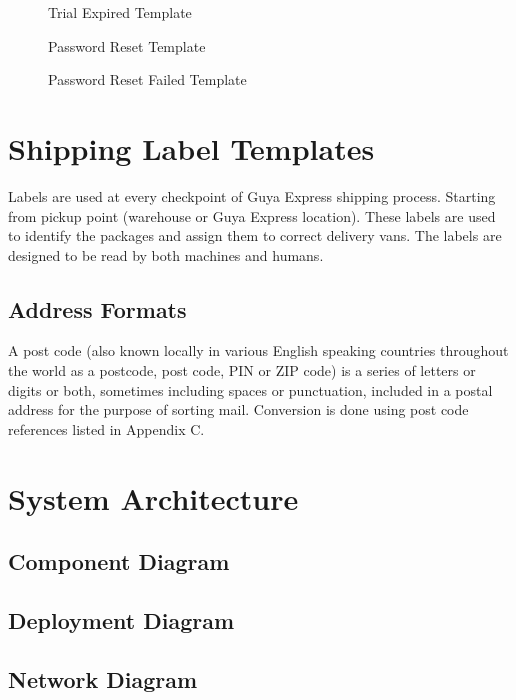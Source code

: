 \begin{figure}[!h]

\caption{Trial Expired Template}
\end{figure}
\clearpage

\begin{figure}[!h]

\caption{Password Reset Template}
\end{figure}
\clearpage

\begin{figure}[!h]

\caption{Password Reset Failed Template}
\end{figure}
\clearpage


\section{Shipping Label Templates}
Labels are used at every checkpoint of Guya Express shipping process. Starting from pickup point (warehouse or Guya Express location). These labels are used to identify the packages and assign them to correct delivery vans. The labels are designed to be read by both machines and humans.
\subsection{Address Formats}
A post code (also known locally in various English speaking countries throughout the world as a postcode, post code, PIN or ZIP code) is a series of letters or digits or both, sometimes including spaces or punctuation, included in a postal address for the purpose of sorting mail. 
Conversion is done using post code references listed in Appendix C.


\section{System Architecture}
\subsection{Component Diagram}

\subsection{Deployment Diagram}

\subsection{Network Diagram}


